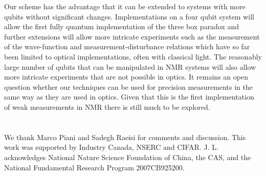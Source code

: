 \documentclass[aps,pra,12pt,onecolumn,showpacs,superscriptaddress,floatfix,footinbib,subfigure]{revtex4}
\begin{document}
Our scheme has the advantage that it can be extended to systems with more qubits without significant changes.  Implementations on a four qubit system will allow the first fully quantum  implementation of the three box paradox  and further extensions will allow more intricate experiments such as the measurement of the wave-function and   measurement-disturbance relations which have so far been limited to optical implementations, often with classical light. The reasonably large number of qubits  that can be manipulated   in NMR systems will also allow more intricate experiments that  are not possible in optics.  It remains an open question whether our techniques can be used for precision measurements in the same way as they are used in optics.  Given that this is the first implementation of weak measurements in NMR there is still much to be explored.

\section*{}
We thank Marco Piani and Sadegh Raeisi for comments and discussion. This work was supported by  Industry Canada, NSERC  and CIFAR. J. L. acknowledges National Nature Science Foundation of China, the CAS, and the National Fundamental Research Program 2007CB925200.
\end{document}
